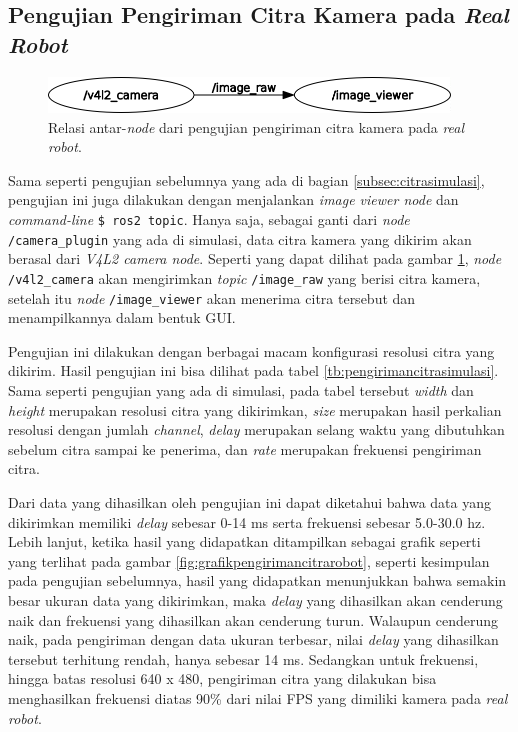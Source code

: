\subsection{Pengujian Pengiriman Citra Kamera pada \emph{Real Robot}}
\label{subsec:citrarobot}

\begin{figure}[ht]
  \centering
  \includegraphics[width=0.95\textwidth,keepaspectratio]{gambar/rosgraph-camera.png}
  \caption{Relasi antar-\emph{node} dari pengujian pengiriman citra kamera pada \emph{real robot}.}
  \label{fig:rosgraphcamera}
\end{figure}

Sama seperti pengujian sebelumnya yang ada di bagian \ref{subsec:citrasimulasi},
  pengujian ini juga dilakukan dengan menjalankan \emph{image viewer node} dan \emph{command-line} \lstinline{$ ros2 topic}.
Hanya saja, sebagai ganti dari \emph{node} \lstinline{/camera_plugin} yang ada di simulasi,
  data citra kamera yang dikirim akan berasal dari \emph{V4L2 camera node}.
Seperti yang dapat dilihat pada gambar \ref{fig:rosgraphcamera},
  \emph{node} \lstinline{/v4l2_camera} akan mengirimkan \emph{topic} \lstinline{/image_raw} yang berisi citra kamera,
  setelah itu \emph{node} \lstinline{/image_viewer} akan menerima citra tersebut dan menampilkannya dalam bentuk GUI.



Pengujian ini dilakukan dengan berbagai macam konfigurasi resolusi citra yang dikirim.
Hasil pengujian ini bisa dilihat pada tabel \ref{tb:pengirimancitrasimulasi}.
Sama seperti pengujian yang ada di simulasi, pada tabel tersebut \emph{width} dan \emph{height} merupakan resolusi citra yang dikirimkan,
  \emph{size} merupakan hasil perkalian resolusi dengan jumlah \emph{channel},
  \emph{delay} merupakan selang waktu yang dibutuhkan sebelum citra sampai ke penerima,
  dan \emph{rate} merupakan frekuensi pengiriman citra.



Dari data yang dihasilkan oleh pengujian ini dapat diketahui bahwa data yang dikirimkan memiliki \emph{delay} sebesar 0-14 ms serta frekuensi sebesar 5.0-30.0 hz.
Lebih lanjut, ketika hasil yang didapatkan ditampilkan sebagai grafik seperti yang terlihat pada gambar \ref{fig:grafikpengirimancitrarobot},
  seperti kesimpulan pada pengujian sebelumnya,
  hasil yang didapatkan menunjukkan bahwa semakin besar ukuran data yang dikirimkan,
  maka \emph{delay} yang dihasilkan akan cenderung naik dan frekuensi yang dihasilkan akan cenderung turun.
Walaupun cenderung naik, pada pengiriman dengan data ukuran terbesar,
  nilai \emph{delay} yang dihasilkan tersebut terhitung rendah, hanya sebesar 14 ms.
Sedangkan untuk frekuensi,
  hingga batas resolusi 640 x 480,
  pengiriman citra yang dilakukan bisa menghasilkan frekuensi diatas 90\% dari nilai FPS yang dimiliki kamera pada \emph{real robot}.
